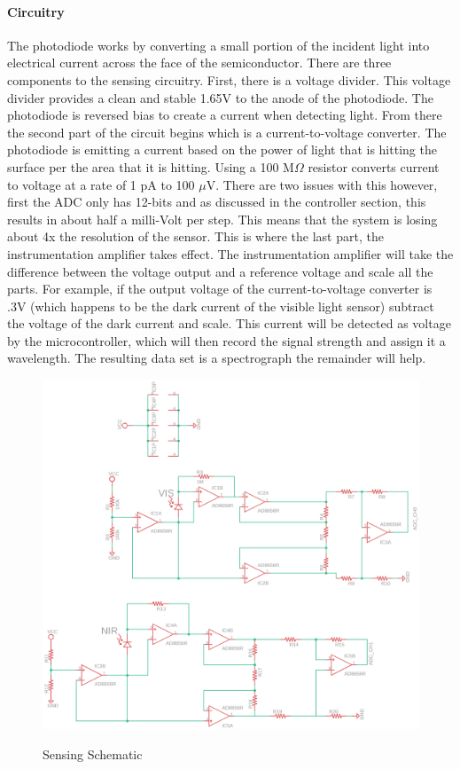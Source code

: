 \paragraph{Circuitry} The photodiode works by converting a small portion of the incident light into electrical current across the face of the semiconductor. There are three components to the sensing circuitry. First, there is a voltage divider. This voltage divider provides a clean and stable 1.65V to the anode of the photodiode. The photodiode is reversed bias to create a current when detecting light. From there the second part of the circuit begins which is a current-to-voltage converter. The photodiode is emitting a current based on the power of light that is hitting the surface per the area that it is hitting. Using a 100 M$\Omega$ resistor converts current to voltage at a rate of 1 pA to 100 $\mu$V. There are two issues with this however, first the ADC only has 12-bits and as discussed in the controller section, this results in about half a milli-Volt per step. This means that the system is losing about 4x the resolution of the sensor. This is where the last part, the instrumentation amplifier takes effect. The instrumentation amplifier will take the difference between the voltage output and a reference voltage and scale all the parts. For example, if the output voltage of the current-to-voltage converter is .3V (which happens to be the dark current of the visible light sensor) subtract the voltage of the dark current and scale. This current will be detected as voltage by the microcontroller, which will then record the signal strength and assign it a wavelength. The resulting data set is a spectrograph the remainder will help.
\begin{figure}[H]
    \caption{Sensing Schematic}
    \centering
    \includegraphics[width=.8\textwidth]{images/sensor-schematic.png}
    \label{fig:sensor-schem}
\end{figure}

